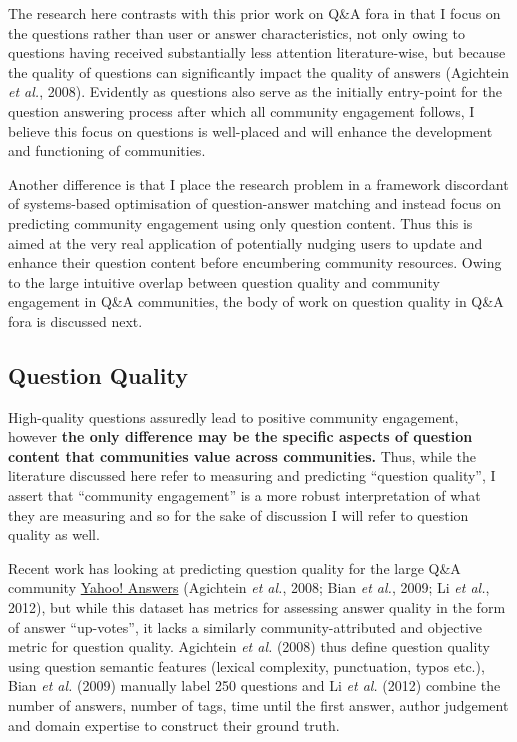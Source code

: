 \documentclass[11pt,preprint, authoryear]{article}
\numberwithin{equation}{section}
\begin{document}
The research here contrasts with this prior work on Q\&A fora in that I
focus on the questions rather than user or answer characteristics, not
only owing to questions having received substantially less attention
literature-wise, but because the quality of questions can significantly
impact the quality of answers (Agichtein \emph{et al.}, 2008). Evidently
as questions also serve as the initially entry-point for the question
answering process after which all community engagement follows, I
believe this focus on questions is well-placed and will enhance the
development and functioning of communities.

Another difference is that I place the research problem in a framework
discordant of systems-based optimisation of question-answer matching and
instead focus on predicting community engagement using only question
content. Thus this is aimed at the very real application of potentially
nudging users to update and enhance their question content before
encumbering community resources. Owing to the large intuitive overlap
between question quality and community engagement in Q\&A communities,
the body of work on question quality in Q\&A fora is discussed next.

\subsection{Question Quality}\label{question-quality}

High-quality questions assuredly lead to positive community engagement,
however \textbf{the only difference may be the specific aspects of
question content that communities value across communities.} Thus, while
the literature discussed here refer to measuring and predicting
``question quality'', I assert that ``community engagement'' is a more
robust interpretation of what they are measuring and so for the sake of
discussion I will refer to question quality as well.

Recent work has looking at predicting question quality for the large
Q\&A community \href{http://answers.yahoo.com}{Yahoo! Answers}
(Agichtein \emph{et al.}, 2008; Bian \emph{et al.}, 2009; Li \emph{et
al.}, 2012), but while this dataset has metrics for assessing answer
quality in the form of answer ``up-votes'', it lacks a similarly
community-attributed and objective metric for question quality.
Agichtein \emph{et al.} (2008) thus define question quality using
question semantic features (lexical complexity, punctuation, typos
etc.), Bian \emph{et al.} (2009) manually label 250 questions and Li
\emph{et al.} (2012) combine the number of answers, number of tags, time
until the first answer, author judgement and domain expertise to
construct their ground truth.
\end{document}
